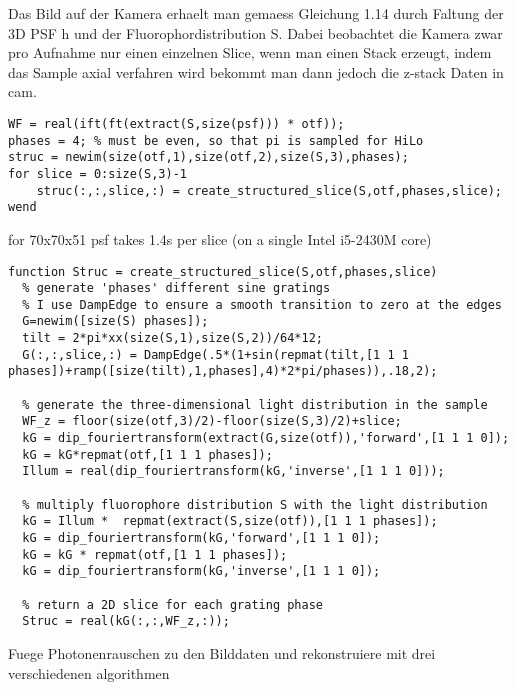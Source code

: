 \vspace{3cm}
Das Bild auf der Kamera erhaelt man gemaess Gleichung 1.14 durch
Faltung der 3D PSF h und der Fluorophordistribution S. Dabei
beobachtet die Kamera zwar pro Aufnahme nur einen einzelnen Slice,
wenn man einen Stack erzeugt, indem das Sample axial verfahren wird
bekommt man dann jedoch die z-stack Daten in cam.


\begin{lstlisting}[style=mymatlab]
WF = real(ift(ft(extract(S,size(psf))) * otf));
phases = 4; % must be even, so that pi is sampled for HiLo
struc = newim(size(otf,1),size(otf,2),size(S,3),phases);
for slice = 0:size(S,3)-1
    struc(:,:,slice,:) = create_structured_slice(S,otf,phases,slice);
wend
\end{lstlisting}

for 70x70x51 psf takes 1.4s per slice (on a single Intel i5-2430M core)

\begin{lstlisting}[style=mymatlab]
function Struc = create_structured_slice(S,otf,phases,slice)
  % generate 'phases' different sine gratings 
  % I use DampEdge to ensure a smooth transition to zero at the edges
  G=newim([size(S) phases]); 
  tilt = 2*pi*xx(size(S,1),size(S,2))/64*12;
  G(:,:,slice,:) = DampEdge(.5*(1+sin(repmat(tilt,[1 1 1 phases])+ramp([size(tilt),1,phases],4)*2*pi/phases)),.18,2);
  
  % generate the three-dimensional light distribution in the sample
  WF_z = floor(size(otf,3)/2)-floor(size(S,3)/2)+slice;
  kG = dip_fouriertransform(extract(G,size(otf)),'forward',[1 1 1 0]);
  kG = kG*repmat(otf,[1 1 1 phases]);
  Illum = real(dip_fouriertransform(kG,'inverse',[1 1 1 0]));
  
  % multiply fluorophore distribution S with the light distribution
  kG = Illum *  repmat(extract(S,size(otf)),[1 1 1 phases]);
  kG = dip_fouriertransform(kG,'forward',[1 1 1 0]);
  kG = kG * repmat(otf,[1 1 1 phases]);
  kG = dip_fouriertransform(kG,'inverse',[1 1 1 0]);
  
  % return a 2D slice for each grating phase
  Struc = real(kG(:,:,WF_z,:));
\end{lstlisting}

\vspace{-7cm}\hspace{12cm}
\vspace{1cm}

Fuege Photonenrauschen zu den Bilddaten und rekonstruiere mit drei verschiedenen algorithmen

